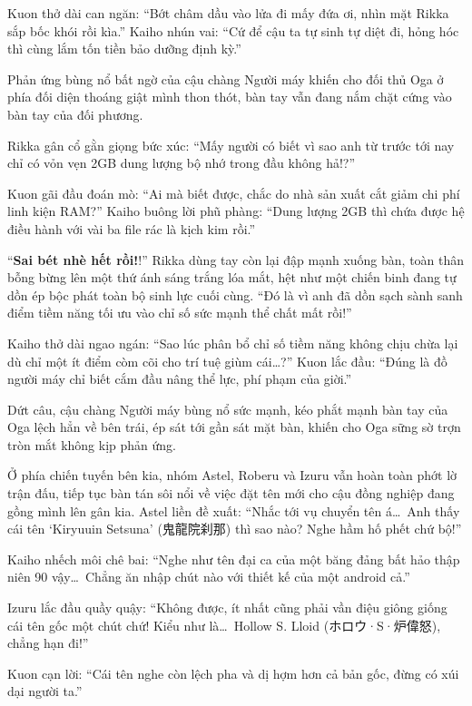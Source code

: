 \documentclass[../main.tex]{subfiles}
\begin{document}
Kuon thở dài can ngăn: ``Bớt châm dầu vào lửa đi mấy đứa ơi, nhìn mặt Rikka sắp bốc khói rồi kìa.'' Kaiho nhún vai: ``Cứ để cậu ta tự sinh tự diệt đi, hỏng hóc thì cùng lắm tốn tiền bảo dưỡng định kỳ.''

Phản ứng bùng nổ bất ngờ của cậu chàng Người máy khiến cho đối thủ Oga ở phía đối diện thoáng giật mình thon thót, bàn tay vẫn đang nắm chặt cứng vào bàn tay của đối phương.

Rikka gân cổ gằn giọng bức xúc: ``Mấy người có biết vì sao anh từ trước tới nay chỉ có vỏn vẹn 2GB dung lượng bộ nhớ trong đầu không hả!?''

Kuon gãi đầu đoán mò: ``Ai mà biết được, chắc do nhà sản xuất cắt giảm chi phí linh kiện RAM?'' Kaiho buông lời phũ phàng: ``Dung lượng 2GB thì chứa được hệ điều hành với vài ba file rác là kịch kim rồi.''

``\textbf{Sai bét nhè hết rồi!}!'' Rikka dùng tay còn lại đập mạnh xuống bàn, toàn thân bỗng bừng lên một thứ ánh sáng trắng lóa mắt, hệt như một chiến binh đang tự dồn ép bộc phát toàn bộ sinh lực cuối cùng. ``Đó là vì anh đã dồn sạch sành sanh điểm tiềm năng tối ưu vào chỉ số sức mạnh thể chất mất rồi!''


Kaiho thở dài ngao ngán: ``Sao lúc phân bổ chỉ số tiềm năng không chịu chừa lại dù chỉ một ít điểm còm cõi cho trí tuệ giùm cái\dots?'' Kuon lắc đầu: ``Đúng là đồ người máy chỉ biết cắm đầu nâng thể lực, phí phạm của giời.''

Dứt câu, cậu chàng Người máy bùng nổ sức mạnh, kéo phắt mạnh bàn tay của Oga lệch hẳn về bên trái, ép sát tới gần sát mặt bàn, khiến cho Oga sững sờ trợn tròn mắt không kịp phản ứng.

Ở phía chiến tuyến bên kia, nhóm Astel, Roberu và Izuru vẫn hoàn toàn phớt lờ trận đấu, tiếp tục bàn tán sôi nổi về việc đặt tên mới cho cậu đồng nghiệp đang gồng mình lên gân kia. Astel liền đề xuất: ``Nhắc tới vụ chuyển tên á\dots\ Anh thấy cái tên `Kiryuuin Setsuna' (鬼龍院刹那) thì sao nào? Nghe hầm hố phết chứ bộ!''

Kaiho nhếch môi chê bai: ``Nghe như tên đại ca của một băng đảng bất hảo thập niên 90 vậy\dots\ Chẳng ăn nhập chút nào với thiết kế của một android cả.''

Izuru lắc đầu quầy quậy: ``Không được, ít nhất cũng phải vần điệu giông giống cái tên gốc một chút chứ! Kiểu như là\dots\ Hollow S. Lloid (ホロウ·S·炉偉怒), chẳng hạn đi!''

Kuon cạn lời: ``Cái tên nghe còn lệch pha và dị hợm hơn cả bản gốc, đừng có xúi dại người ta.''
\end{document}
